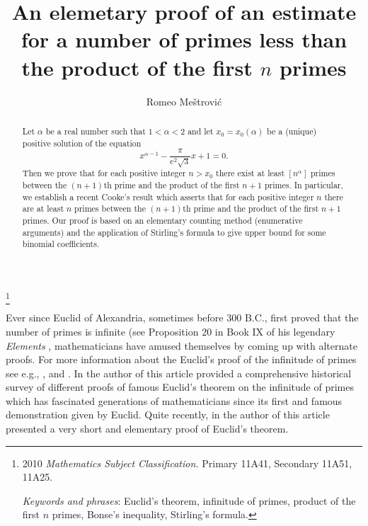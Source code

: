\documentclass[12pt]{amsart}
\begin{document}
\title[An elemetary proof  of an estimate for a number of primes
\ldots] {An elemetary proof  of an estimate for a number of primes
less  than the product of the first $n$ primes}



\author{Romeo Me\v{s}trovi\'{c}}

{\renewcommand{\thefootnote}{}\footnote{2010 {\it Mathematics Subject 
Classification.} Primary 11A41, Secondary 11A51, 11A25.

{\it Keywords and phrases}: 
Euclid's theorem, infinitude of primes, product of the first $n$ primes,
Bonse's inequality, Stirling's formula.}
  \setcounter{footnote}{0}}
\maketitle

\begin{abstract} 
Let $\alpha$ be a real number such that $1< \alpha <2$ and let 
$x_0=x_0(\alpha)$ be a {\rm(}unique{\rm)} positive solution of the equation 
$$
x^{\alpha-1} -\frac{\pi}{e^2\sqrt{3}}x +1=0.
$$
 Then we prove that for each  positive integer $n>x_0$ there exist at least  
$\left[n^\alpha\right]$ primes between the $(n+1)$th prime and the product of 
the first $n+1$ primes. In particular, we establish a recent Cooke's result 
which asserts that for each positive integer $n$ there are at least 
$n$ primes between the $(n+1)$th prime and the product of the first $n+1$ 
primes. Our proof is based on an  elementary counting method (enumerative 
arguments) and the application of Stirling's formula to give upper 
bound for some binomial coefficients.
   \end{abstract}

Ever since  Euclid of Alexandria, sometimes before
300 {\small B.C.},  first  proved that the number of primes is infinite
(see  Proposition 20 in Book IX  of his legendary {\it Elements}
 \cite{he},
mathematicians have amused themselves by coming up 
with alternate proofs. For more information about the Euclid's proof
of the infinitude of primes see e.g., \cite[p. 414, Ch. XVIII]{d}, 
 and \cite[Section 1]{me}. 
In \cite{me} the author of this article provided a comprehensive 
historical survey of different proofs
of  famous Euclid's theorem on the infinitude of primes
 which has  fascinated generations of mathematicians since its 
first and famous demonstration given by Euclid.
Quite recently, in \cite{me2} the author of this article
presented a  very short and  elementary proof of Euclid's theorem.
\end{document}
